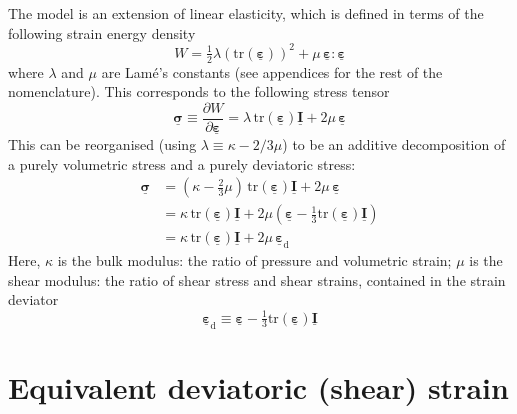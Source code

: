\documentclass[times,namecite]{goose-article}
\newcommand\T[1]{\underline{\bm{{#1}}}}
\begin{document}
The model is an extension of linear elasticity, which is defined in terms of the following strain energy density
\begin{equation}
\label{eq:energy:elastic}
  W = \tfrac{1}{2} \lambda \left( \mathrm{tr} ( \T{\varepsilon} ) \right)^2 + \mu \, \T{\varepsilon} : \T{\varepsilon}
\end{equation}
where $\lambda$ and $\mu$ are Lam\'{e}'s constants (see appendices for the rest of the nomenclature). This corresponds to the following stress tensor
\begin{equation}
  \T{\sigma} \equiv \frac{\partial W}{\partial \T{\varepsilon}}
  = \lambda \, \mathrm{tr} ( \T{\varepsilon} ) \T{I} + 2 \mu \, \T{\varepsilon}
\end{equation}
This can be reorganised (using $\lambda \equiv \kappa - 2/3 \mu$) to be an additive decomposition of a purely volumetric stress and a purely deviatoric stress:
\begin{align}
  \T{\sigma}
  &= \left( \kappa - \tfrac{2}{3} \mu \right) \, \mathrm{tr} ( \T{\varepsilon} ) \T{I} + 2 \mu \, \T{\varepsilon}
  \\
  &= \kappa \, \mathrm{tr} ( \T{\varepsilon} ) \T{I} + 2 \mu \left( \T{\varepsilon} - \tfrac{1}{3} \mathrm{tr} ( \T{\varepsilon} ) \T{I} \right)
  \\
  &= \kappa \, \mathrm{tr} ( \T{\varepsilon} ) \T{I} + 2 \mu \, \T{\varepsilon}_\mathrm{d}
\end{align}
Here, $\kappa$ is the bulk modulus: the ratio of pressure and volumetric strain; $\mu$ is the shear modulus: the ratio of shear stress and shear strains, contained in the strain deviator
\begin{equation}
  \T{\varepsilon}_\mathrm{d} \equiv \T{\varepsilon} - \tfrac{1}{3} \mathrm{tr} ( \T{\varepsilon} ) \T{I}
\end{equation}

\section{Equivalent deviatoric (shear) strain}
\end{document}
